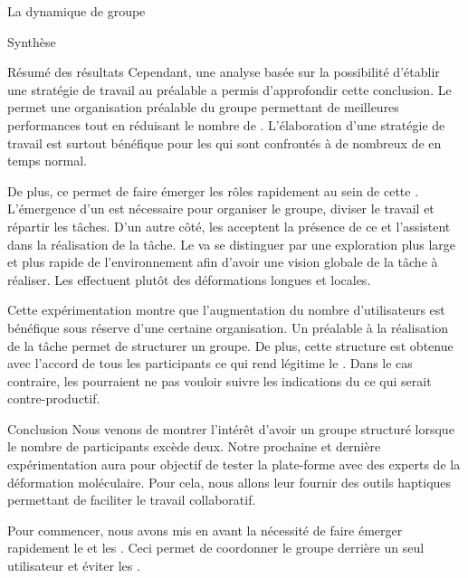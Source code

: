 \documentclass[myfrancais,ngerman,english,frenchb]{mythesis}
\begin{document}
\begin{mychapter}{La dynamique de groupe}
\begin{mysection}{Synthèse}
\begin{mysubsection}{Résumé des résultats}
				Cependant, une analyse basée sur la possibilité d'établir une stratégie de travail au préalable a permis d'approfondir cette conclusion.
				Le \mybrainstorming permet une organisation préalable du groupe permettant de meilleures performances tout en réduisant le nombre de .
				L'élaboration d'une stratégie de travail est surtout bénéfique pour les  qui sont confrontés à de nombreux de  en temps normal.

				De plus, ce \mybrainstorming permet de faire émerger les rôles rapidement au sein de cette .
				L'émergence d'un  est nécessaire pour organiser le groupe, diviser le travail et répartir les tâches.
				D'un autre côté, les  acceptent la présence de ce  et l'assistent dans la réalisation de la tâche.
				Le  va se distinguer par une exploration plus large et plus rapide de l'environnement afin d'avoir une vision globale de la tâche à réaliser.
				Les  effectuent plutôt des déformations longues et locales.

				Cette expérimentation montre que l'augmentation du nombre d'utilisateurs est bénéfique sous réserve d'une certaine organisation.
				Un \mybrainstorming préalable à la réalisation de la tâche permet de structurer un groupe.
				De plus, cette structure est obtenue avec l'accord de tous les participants ce qui rend légitime le .
				Dans le cas contraire, les  pourraient ne pas vouloir suivre les indications du  ce qui serait contre-productif.
			\end{mysubsection}
			\begin{mysubsection}{Conclusion}
				Nous venons de montrer l'intérêt d'avoir un groupe structuré lorsque le nombre de participants excède deux.
				Notre prochaine et dernière expérimentation aura pour objectif de tester la plate-forme avec des experts de la déformation moléculaire.
				Pour cela, nous allons leur fournir des outils haptiques permettant de faciliter le travail collaboratif.

				Pour commencer, nous avons mis en avant la nécessité de faire émerger rapidement le  et les .
				Ceci permet de coordonner le groupe derrière un seul utilisateur et éviter les .


\end{mysubsection}
\end{mysection}
\end{mychapter}
\end{document}
